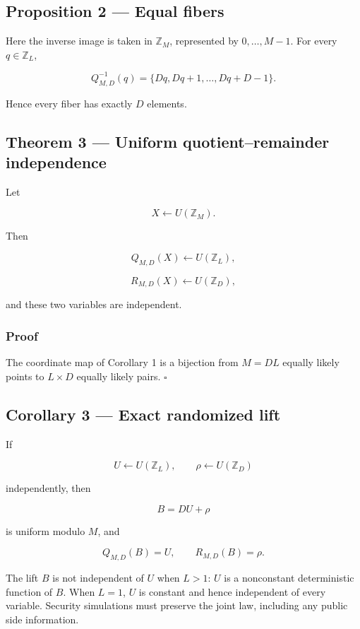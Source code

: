 \documentclass[11pt,a4paper]{article}
\begin{document}
\subsection{Proposition 2 --- Equal fibers}\label{proposition-2-equal-fibers}

Here the inverse image is taken in \(\mathbb Z_M\), represented by \(0,\ldots,M-1\). For every \(q\in\mathbb Z_L\),

\[
Q_{M,D}^{-1}(q)
=
\{Dq,Dq+1,\ldots,Dq+D-1\}.
\]

Hence every fiber has exactly \(D\) elements.

\subsection{Theorem 3 --- Uniform quotient--remainder independence}\label{theorem-3-uniform-quotientremainder-independence}

Let

\[
X\leftarrow U(\mathbb Z_M).
\]

Then

\[
Q_{M,D}(X)\leftarrow U(\mathbb Z_L),
\]

\[
R_{M,D}(X)\leftarrow U(\mathbb Z_D),
\]

and these two variables are independent.

\subsubsection{Proof}\label{proof-1}

The coordinate map of Corollary 1 is a bijection from \(M=DL\) equally likely points to \(L\times D\) equally likely pairs. \(\square\)

\subsection{Corollary 3 --- Exact randomized lift}\label{corollary-3-exact-randomized-lift}

If

\[
U\leftarrow U(\mathbb Z_L),
\qquad
\rho\leftarrow U(\mathbb Z_D)
\]

independently, then

\[
B=DU+\rho
\]

is uniform modulo \(M\), and

\[
Q_{M,D}(B)=U,\qquad R_{M,D}(B)=\rho.
\]

The lift \(B\) is not independent of \(U\) when \(L>1\): \(U\) is a nonconstant deterministic function of \(B\). When \(L=1\), \(U\) is constant and hence independent of every variable. Security simulations must preserve the joint law, including any public side information.
\end{document}
